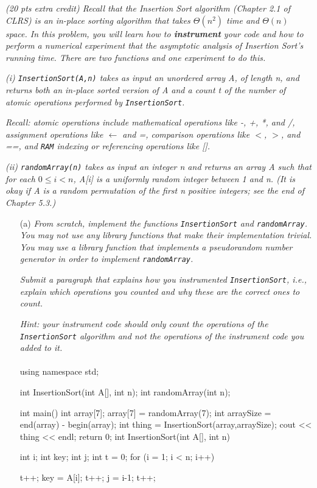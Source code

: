 \documentclass[11pt]{article} \setlength{\oddsidemargin}{0in}
\newenvironment{qv}
{\quote\Verbatim}{\endVerbatim\endquote}
\begin{document}
{  \textit{(20 pts extra credit) Recall that the Insertion Sort algorithm
    (Chapter 2.1 of CLRS) is an in-place sorting algorithm that takes
    $\Theta(n^2)$ time and $\Theta(n)$ space. In this problem, you will learn how
    to \textbf{instrument} your code and how to perform a numerical
    experiment that the asymptotic analysis of Insertion Sort's running
    time. There are two functions and one experiment to do this.}

  \textit{(i) \texttt{InsertionSort(A,n)} takes as input an unordered
    array A, of length n, and returns both an in-place sorted version of
    A and a count t of the number of atomic operations performed by
    \texttt{InsertionSort}.}

  \textit{Recall: atomic operations include mathematical operations like
    -, +, *, and /, assignment operations like $\gets$ and =, comparison
    operations like $<$, $>$, and ==, and \texttt{RAM} indexing or
    referencing operations like [].}

  \textit{(ii) \texttt{randomArray(n)} takes as input an integer n and
    returns an array A such that for each $0 \le i < n$, A[i] is a
    uniformly random integer between 1 and n. (It is okay if A is a
    random permutation of the first n positive integers; see the end of
    Chapter 5.3.)}

  \begin{enumerate}
  \item[(a)] \textit{From scratch, implement the functions
      \texttt{InsertionSort} and \texttt{randomArray}. You may not use
      any library functions that make their implementation trivial. You
      may use a library function that implements a pseudorandom number
      generator in order to implement \texttt{randomArray}.}

    \textit{Submit a paragraph that explains how you instrumented
      \texttt{InsertionSort}, i.e., explain which operations you counted
      and why these are the correct ones to count.}

    \textit{Hint: your instrument code should only count the operations
      of the \texttt{InsertionSort} algorithm and not the operations of
      the instrument code you added to it.}
    \\\\
    \begin{qv}
using namespace std;

int InsertionSort(int A[], int n);
int randomArray(int n);

int main()
{
	int array[7];
	array[7] = randomArray(7);
	int arraySize = end(array) - begin(array);
	int thing = InsertionSort(array,arraySize);
	cout << thing << endl;
	return 0;
}
int InsertionSort(int A[], int n)
{
   int i;
   int key;
   int j;
   int t = 0;
   for (i = 1; i < n; i++)
   {
   	   t++;
       key = A[i];
       t++;
       j = i-1;
       t++;
 
}}
\end{qv}
\end{enumerate}}
\end{document}
